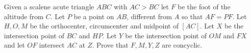 Given a scalene acute triangle $ ABC$ with $ AC>BC$ let $ F$ be the foot of the altitude from $ C$. Let $ P$ be a point on $ AB$, different from $ A$ so that $ AF=PF$. Let $ H,O,M$ be the orthocenter, circumcenter and midpoint of $ [AC]$. Let $ X$ be the intersection point of $ BC$ and $ HP$. Let $ Y$ be the intersection point of $ OM$ and $ FX$ and let $ OF$ intersect $ AC$ at $ Z$. Prove that $ F,M,Y,Z$ are concyclic.